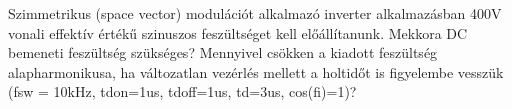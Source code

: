 \begin{example}

Szimmetrikus (space vector) modulációt alkalmazó inverter alkalmazásban 400V vonali effektív értékű szinuszos feszültséget kell előállítanunk. Mekkora DC bemeneti feszültség szükséges? Mennyivel csökken a kiadott feszültség alapharmonikusa, ha változatlan vezérlés mellett a holtidőt is figyelembe vesszük (fsw = 10kHz, tdon=1us, tdoff=1us, td=3us, cos(fi)=1)? 

\tcbline
\vspace{1mm}

\solution

\end{example}